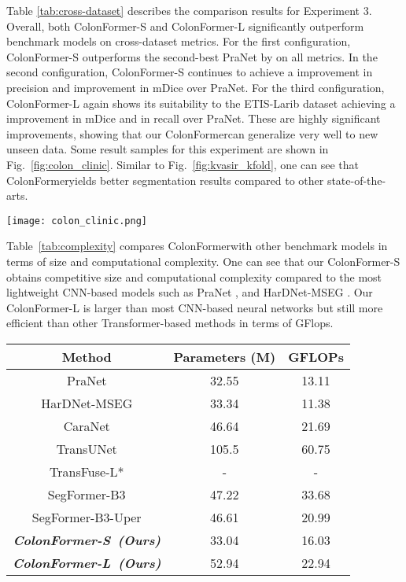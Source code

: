 \documentclass{article}
\newcommand{\ModelName}{ColonFormer}
\begin{document}
{Table \ref{tab:cross-dataset} describes the comparison results for Experiment 3. Overall, both \ModelName-S and \ModelName-L significantly outperform benchmark models on cross-dataset metrics. For the first configuration, \ModelName-S outperforms the second-best PraNet by  on all metrics. In the second configuration, \ModelName-S continues to achieve a  improvement in precision and  improvement in mDice over PraNet. For the third configuration, \ModelName-L again shows its suitability to the ETIS-Larib dataset achieving a  improvement in mDice and  in recall over PraNet. These are highly significant improvements, showing that our \ModelName can generalize very well to new unseen data. Some result samples for this experiment are shown in Fig.~\ref{fig:colon_clinic}. Similar to Fig.~\ref{fig:kvasir_kfold}, one can see that \ModelName yields better segmentation results compared to other state-of-the-arts.


\begin{figure*}[ht!]
\centering
\texttt{[image: colon\_clinic.png]}
\caption{Qualitative result comparison using CVC-Colon for training and CVC-Clinic for testing.}
\label{fig:colon_clinic}
\end{figure*}

Table~\ref{tab:complexity} compares \ModelName with other benchmark models in terms of size and computational complexity. One can see that our \ModelName-S obtains competitive size and computational complexity compared to the most lightweight CNN-based models such as PraNet \cite{pranet}, and HarDNet-MSEG \cite{hardnet_mseg}. Our \ModelName-L is larger than most CNN-based neural networks but still more efficient than other Transformer-based methods in terms of GFlops.

\begin{table*}[ht!]
\caption{Number of parameters and GFLOPs of different methods}
\centering
{\renewcommand{\arraystretch}{1.2}
\begin{tabular}{c|cc}
\hline
Method & Parameters (M) & GFLOPs\\
\hline
\hline
PraNet \cite{pranet}  & 32.55 &   13.11        \\
HarDNet-MSEG \cite{hardnet_mseg} & 33.34 & 11.38         \\
CaraNet \cite{caranet} & 46.64 & 21.69       \\
TransUNet \cite{transunet} & 105.5 & 60.75         \\
TransFuse-L* \cite{transfuse} & - & -          \\
SegFormer-B3 \cite{segformer} & 47.22 & 33.68 \\
SegFormer-B3-Uper & 46.61 & 20.99 \\
\textit{\textbf{\ModelName-S~(Ours)}} & 33.04 & 16.03 \\
\textit{\textbf{\ModelName-L~(Ours)}} & 52.94 & 22.94         \\
\hline
\end{tabular}
}
\label{tab:complexity}
\end{table*}
}
\end{document}
